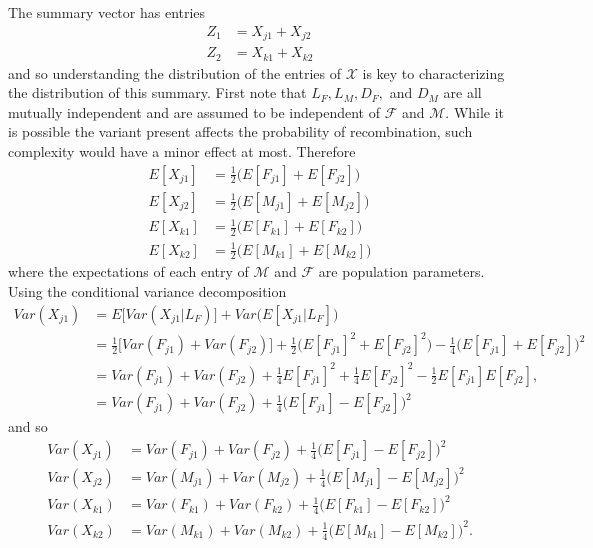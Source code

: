 \documentclass{article}
\begin{document}
The summary vector has entries
\begin{align*}
  Z_1 & = X_{j1} + X_{j2} \\
  Z_2 & = X_{k1} + X_{k2}
\end{align*}
and so understanding the distribution of the entries of $\mathcal{X}$ is key to characterizing the distribution of this summary. First note that $L_F, L_M, D_F,$ and $D_M$ are all mutually independent and are assumed to be independent of $\mathcal{F}$ and $\mathcal{M}$. While it is possible the variant present affects the probability of recombination, such complexity would have a minor effect at most. Therefore
\begin{align}
  E[X_{j1}] & = \frac{1}{2} \Big ( E[F_{j1}] + E[F_{j2}] \Big ) \label{eq:Exj1}\\ 
  E[X_{j2}] & = \frac{1}{2} \Big ( E[M_{j1}] + E[M_{j2}] \Big ) \label{eq:Exj2} \\ 
  E[X_{k1}] & = \frac{1}{2} \Big ( E[F_{k1}] + E[F_{k2}] \Big ) \label{eq:Exk1} \\ 
  E[X_{k2}] & = \frac{1}{2} \Big ( E[M_{k1}] + E[M_{k2}] \Big ) \label{eq:Exk2}
\end{align}
where the expectations of each entry of $\mathcal{M}$ and $\mathcal{F}$ are population parameters. Using the conditional variance decomposition
\begin{align*}
  Var(X_{j1}) & = E \Big [ Var(X_{j1} | L_F) \Big ] + Var \Big ( E[X_{j1} | L_F] \Big ) \\
              & = \frac{1}{2} \Big [ Var(F_{j1}) + Var(F_{j2}) \Big ] + \frac{1}{2} \Big ( E[F_{j1}]^2 + E[F_{j2}]^2 \Big ) - \frac{1}{4} \Big ( E[F_{j1}] + E[F_{j2}] \Big )^2 \\
              & = Var(F_{j1}) + Var(F_{j2}) + \frac{1}{4} E[F_{j1}]^2 + \frac{1}{4} E[F_{j2}]^2 - \frac{1}{2} E[F_{j1}] E[F_{j2}], \\
              & = Var(F_{j1}) + Var(F_{j2}) + \frac{1}{4} \Big ( E[F_{j1}] - E[F_{j2}] \Big )^2
\end{align*}
and so
\begin{align}
  Var(X_{j1}) & = Var(F_{j1}) + Var(F_{j2}) + \frac{1}{4} \Big ( E[F_{j1}] - E[F_{j2}] \Big )^2 \label{eq:varxj1} \\
  Var(X_{j2}) & = Var(M_{j1}) + Var(M_{j2}) + \frac{1}{4} \Big ( E[M_{j1}] - E[M_{j2}] \Big )^2 \label{eq:varxj2} \\
  Var(X_{k1}) & = Var(F_{k1}) + Var(F_{k2}) + \frac{1}{4} \Big ( E[F_{k1}] - E[F_{k2}] \Big )^2 \label{eq:varxk1} \\
  Var(X_{k2}) & = Var(M_{k1}) + Var(M_{k2}) + \frac{1}{4} \Big ( E[M_{k1}] - E[M_{k2}] \Big )^2 \label{eq:varxk2}.
\end{align}
\end{document}
